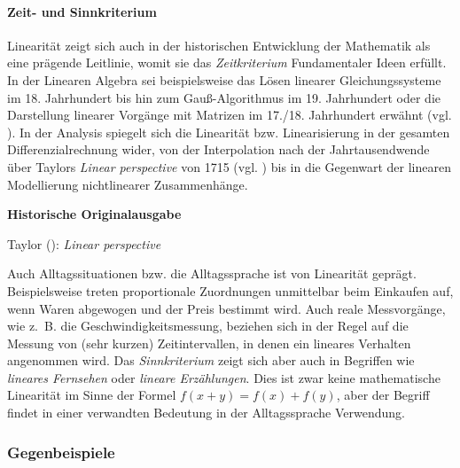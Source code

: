 \documentclass[
]{scrbook}
\renewenvironment{quote}{
  \list{}{
	\leftmargin0.2cm   %
    \rightmargin\leftmargin
      	\def\FrameCommand
    {%
        {\color{quoteColor}\vrule width 2pt}%
        \hspace{0pt}%
    }%
    \MakeFramed{\advance \hsize -\width \FrameRestore}    \color{quoteColor}
    }
  \item\relax
}
{\endlist\color{black}\endMakeFramed}
\theoremstyle{definition}
\theoremstyle{definition}
\theoremstyle{definition}
\theoremstyle{definition}
\theoremstyle{remark}
\begin{document}
\paragraph*{Zeit- und Sinnkriterium}\label{zeit--und-sinnkriterium}

Linearität zeigt sich auch in der historischen Entwicklung der Mathematik als eine prägende Leitlinie, womit sie das \emph{Zeitkriterium} Fundamentaler Ideen erfüllt. In der Linearen Algebra sei beispielsweise das Lösen linearer Gleichungssysteme im 18. Jahrhundert bis hin zum Gauß-Algorithmus im 19. Jahrhundert oder die Darstellung linearer Vorgänge mit Matrizen im 17./18. Jahrhundert erwähnt (vgl. ). In der Analysis spiegelt sich die Linearität bzw. Linearisierung in der gesamten Differenzialrechnung wider, von der Interpolation nach der Jahrtausendwende über Taylors \emph{Linear perspective} von 1715 (vgl. ) bis in die Gegenwart der linearen Modellierung nichtlinearer Zusammenhänge.

\begin{quote}
\textbf{Historische Originalausgabe}

Taylor (): \emph{Linear perspective}
\end{quote}

Auch Alltagssituationen bzw. die Alltagssprache ist von Linearität geprägt. Beispielsweise treten proportionale Zuordnungen unmittelbar beim Einkaufen auf, wenn Waren abgewogen und der Preis bestimmt wird. Auch reale Messvorgänge, wie z.~B. die Geschwindigkeitsmessung, beziehen sich in der Regel auf die Messung von (sehr kurzen) Zeitintervallen, in denen ein lineares Verhalten angenommen wird. Das \emph{Sinnkriterium} zeigt sich aber auch in Begriffen wie \emph{lineares Fernsehen} oder \emph{lineare Erzählungen}. Dies ist zwar keine mathematische Linearität im Sinne der Formel \(f(x+y) = f(x) +f(y)\), aber der Begriff findet in einer verwandten Bedeutung in der Alltagssprache Verwendung.

\subsubsection{Gegenbeispiele}\label{gegenbeispiele}
\end{document}
